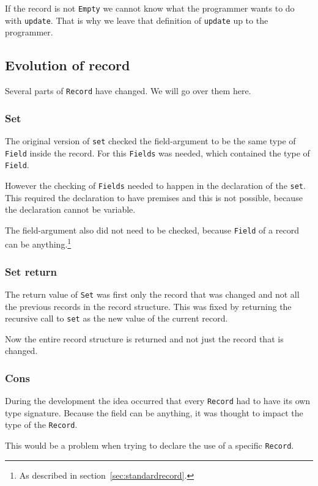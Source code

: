 If the record is not \texttt{Empty} we cannot know what the programmer wants to do with \texttt{update}.
That is why we leave that definition of \texttt{update} up to the programmer.



\subsection{Evolution of record}
Several parts of \texttt{Record} have changed.
We will go over them here.

\subsubsection{Set}\label{sec:recordevolutionsetget}
The original version of \texttt{set} checked the field-argument to be the same type of \texttt{Field} inside the record.
For this \texttt{Fields} was needed, which contained the type of \texttt{Field}.

However the checking of \texttt{Fields} needed to happen in the declaration of the \texttt{set}.
This required the declaration to have premises and this is not possible, because the declaration cannot be variable.

The field-argument also did not need to be checked, because \texttt{Field} of a record can be anything.\footnote{As described in section~\ref{sec:standardrecord}.}

\subsubsection{Set return}
The return value of \texttt{Set} was first only the record that was changed and not all the previous records in the record structure.
This was fixed by returning the recursive call to \texttt{set} as the new value of the current record.

Now the entire record structure is returned and not just the record that is changed.


\subsubsection{Cons}
During the development the idea occurred that every \texttt{Record} had to have its own type signature.
Because the field can be anything, it was thought to impact the type of the \texttt{Record}.

This would be a problem when trying to declare the use of a specific
\newline \texttt{Record}.

